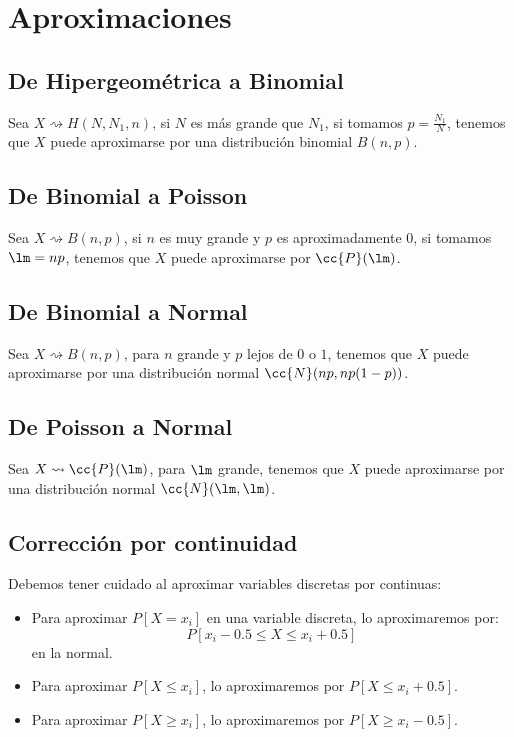 \section{Aproximaciones}
\subsection{De Hipergeométrica a Binomial}
\noindent
Sea $X\rightsquigarrow H(N,N_1,n)$, si $N$ es más grande que $N_1$, si tomamos $p = \frac{N_1}{N}$, tenemos que $X$ puede aproximarse por una distribución binomial $B(n,p)$.

\subsection{De Binomial a Poisson}
\noindent
Sea $X\rightsquigarrow B(n,p)$, si $n$ es muy grande y $p$ es aproximadamente $0$, si tomamos $\lm = np$, tenemos que $X$ puede aproximarse por $\cc{P}(\lm)$.

\subsection{De Binomial a Normal}
\noindent
Sea $X\rightsquigarrow B(n,p)$, para $n$ grande y $p$ lejos de $0$ o $1$, tenemos que $X$ puede aproximarse por una distribución normal $\cc{N}(np, np(1-p))$.

\subsection{De Poisson a Normal}
\noindent
Sea $X\rightsquigarrow\cc{P}(\lm)$, para $\lm$ grande, tenemos que $X$ puede aproximarse por una distribución normal $\cc{N}(\lm, \lm)$.

\subsection{Corrección por continuidad}
Debemos tener cuidado al aproximar variables discretas por continuas:
\begin{itemize}
    \item Para aproximar $P[X=x_i]$ en una variable discreta, lo aproximaremos por:
        \begin{equation*}
            P[x_i - 0.5 \leq X \leq x_i + 0.5]
        \end{equation*}
        en la normal.
    \item Para aproximar $P[X\leq x_i]$, lo aproximaremos por $P[X\leq x_i + 0.5]$.
    \item Para aproximar $P[X\geq x_i]$, lo aproximaremos por $P[X\geq x_i - 0.5]$.
\end{itemize}
